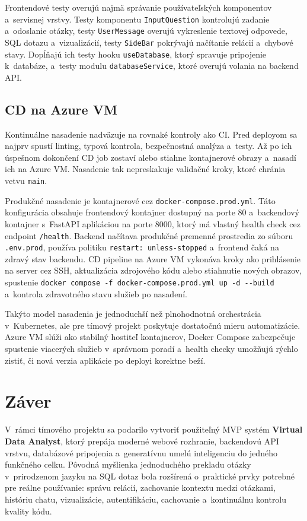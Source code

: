 \documentclass[a4paper, 12pt]{article}
\begin{document}
Frontendové testy overujú najmä správanie používateľských komponentov a~servisnej vrstvy. Testy komponentu \texttt{InputQuestion} kontrolujú zadanie a~odoslanie otázky, testy \texttt{UserMessage} overujú vykreslenie textovej odpovede, SQL dotazu a~vizualizácií, testy \texttt{SideBar} pokrývajú načítanie relácií a~chybové stavy. Dopĺňajú ich testy hooku \texttt{useDatabase}, ktorý spravuje pripojenie k~databáze, a~testy modulu \texttt{databaseService}, ktoré overujú volania na backend API.

\subsection{CD na Azure VM}

Kontinuálne nasadenie nadväzuje na rovnaké kontroly ako CI. Pred deployom sa najprv spustí linting, typová kontrola, bezpečnostná analýza a~testy. Až po ich úspešnom dokončení CD job zostaví alebo stiahne kontajnerové obrazy a~nasadí ich na Azure VM. Nasadenie tak nepreskakuje validačné kroky, ktoré chránia vetvu \texttt{main}.

Produkčné nasadenie je kontajnerové cez \texttt{docker-compose.prod.yml}. Táto konfigurácia obsahuje frontendový kontajner dostupný na porte 80 a~backendový kontajner s~FastAPI aplikáciou na porte 8000, ktorý má vlastný health check cez endpoint \texttt{/health}. Backend načítava produkčné premenné prostredia zo súboru \texttt{.env.prod}, používa politiku \texttt{restart: unless-stopped} a~frontend čaká na zdravý stav backendu. CD pipeline na Azure VM vykonáva kroky ako prihlásenie na server cez SSH, aktualizácia zdrojového kódu alebo stiahnutie nových obrazov, spustenie \texttt{docker compose -f docker-compose.prod.yml up -d {-}{-}build} a~kontrola zdravotného stavu služieb po nasadení.

Takýto model nasadenia je jednoduchší než plnohodnotná orchestrácia v~Kubernetes, ale pre tímový projekt poskytuje dostatočnú mieru automatizácie. Azure VM slúži ako stabilný hostiteľ kontajnerov, Docker Compose zabezpečuje spustenie viacerých služieb v~správnom poradí a~health checky umožňujú rýchlo zistiť, či nová verzia aplikácie po deployi korektne beží.


\clearpage
\section{Záver}

V~rámci tímového projektu sa podarilo vytvoriť použiteľný MVP systém \textbf{Virtual Data Analyst}, ktorý prepája moderné webové rozhranie, backendovú API vrstvu, databázové pripojenia a~generatívnu umelú inteligenciu do jedného funkčného celku. Pôvodná myšlienka jednoduchého prekladu otázky v~prirodzenom jazyku na SQL dotaz bola rozšírená o~praktické prvky potrebné pre reálne používanie: správu relácií, zachovanie kontextu medzi otázkami, históriu chatu, vizualizácie, autentifikáciu, cachovanie a~kontinuálnu kontrolu kvality kódu.
\end{document}
